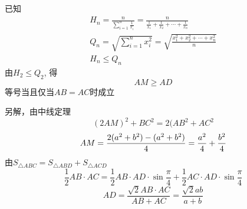 \documentclass[UTF8]{article}
\begin{document}
已知
$$
\begin{array}{c} 
  H_{n}=\frac{n}{\sum \limits_{i=1}^{n}\frac{1}{x_{i}}}= \frac{n}{\frac{1}{x_{1}}+ \frac{1}{x_{2}}+ \cdots + \frac{1}{x_{n}}} \\ Q_{n}=\sqrt{\sum \limits_{i=1}^{n}x_{i}^{2}}= \sqrt{\frac{x_{1}^{2}+ x_{2}^{2}+ \cdots + x_{n}^{2}}{n}} \\ H_{n}\leq Q_{n} 
\end{array}
$$
由$H_2\le Q_2$,
得
$$
AM\ge AD
$$
等号当且仅当$AB=AC$时成立

另解，由中线定理
$$
{\left( {2AM} \right)^2} + B{C^2} = 2(A{B^2} + A{C^2}$$
$$AM = \frac{{2({a^2} + {b^2}) - ({a^2} + {b^2})}}{4} = \frac{{{a^2}}}{4} + \frac{{{b^2}}}{4}\\
$$
由$S_{\triangle ABC}=S_{\triangle ABD}+S_{\triangle ACD}$
$$
\frac{1}{2}AB \cdot AC = \frac{1}{2}AB \cdot AD \cdot \sin \frac{\pi }{4} + \frac{1}{2}AC \cdot AD \cdot \sin \frac{\pi }{4}$$
$$
AD = \frac{{\sqrt 2 AB \cdot AC}}{{AB + AC}} = \frac{{\sqrt 2 ab}}{{a + b}}
$$



\end{document}
